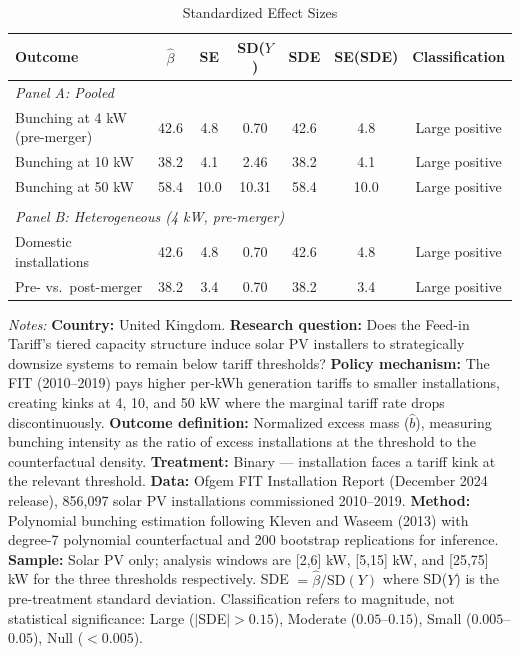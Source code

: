 \begin{table}[t]
\centering
\caption{Standardized Effect Sizes}
\label{tab:sde}
\begin{tabular}{lcccccc}
\toprule
Outcome & $\hat{\beta}$ & SE & SD($Y$) & SDE & SE(SDE) & Classification \\
\midrule
\multicolumn{7}{l}{\textit{Panel A: Pooled}} \\
Bunching at 4 kW (pre-merger) & 42.6 & 4.8 & 0.70 & 42.6 & 4.8 & Large positive \\
Bunching at 10 kW & 38.2 & 4.1 & 2.46 & 38.2 & 4.1 & Large positive \\
Bunching at 50 kW & 58.4 & 10.0 & 10.31 & 58.4 & 10.0 & Large positive \\
 & & & & & & \\
\multicolumn{7}{l}{\textit{Panel B: Heterogeneous (4 kW, pre-merger)}} \\
Domestic installations & 42.6 & 4.8 & 0.70 & 42.6 & 4.8 & Large positive \\
Pre- vs.\ post-merger & 38.2 & 3.4 & 0.70 & 38.2 & 3.4 & Large positive \\
\bottomrule
\end{tabular}
\par\vspace{0.3em}\begin{flushleft}\small
\textit{Notes:} \textbf{Country:} United Kingdom. \textbf{Research question:} Does the Feed-in Tariff's tiered capacity structure induce solar PV installers to strategically downsize systems to remain below tariff thresholds? \textbf{Policy mechanism:} The FIT (2010--2019) pays higher per-kWh generation tariffs to smaller installations, creating kinks at 4, 10, and 50 kW where the marginal tariff rate drops discontinuously. \textbf{Outcome definition:} Normalized excess mass ($\hat{b}$), measuring bunching intensity as the ratio of excess installations at the threshold to the counterfactual density. \textbf{Treatment:} Binary --- installation faces a tariff kink at the relevant threshold. \textbf{Data:} Ofgem FIT Installation Report (December 2024 release), 856,097 solar PV installations commissioned 2010--2019. \textbf{Method:} Polynomial bunching estimation following Kleven and Waseem (2013) with degree-7 polynomial counterfactual and 200 bootstrap replications for inference. \textbf{Sample:} Solar PV only; analysis windows are [2,6] kW, [5,15] kW, and [25,75] kW for the three thresholds respectively. SDE $= \hat{\beta} / \text{SD}(Y)$ where SD($Y$) is the pre-treatment standard deviation. Classification refers to magnitude, not statistical significance: Large ($|$SDE$| > 0.15$), Moderate ($0.05$--$0.15$), Small ($0.005$--$0.05$), Null ($< 0.005$).
\end{flushleft}
\end{table}


